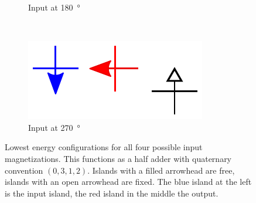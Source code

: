 \documentclass[11pt,a4paper,english]{article}
\newcommand{\rulesep}{\unskip\ \vrule\ }
\begin{document}
\begin{figure}
\begin{subfigure}[t]{0.23\textwidth}
        \caption{Input at \SI{180}{\degree}}
    \end{subfigure}
    \rulesep
    \begin{subfigure}[t]{0.23\textwidth}
        \includegraphics[width=\textwidth]{Figures/half_adder/schematic/000006side_inputs_In1_0312/Input 270 deg.pdf}
        \caption{Input at \SI{270}{\degree}}
    \end{subfigure}
    \caption{Lowest energy configurations for all four possible input magnetizations. This functions as a half adder with quaternary convention $(0,3,1,2)$. Islands with a filled arrowhead are free, islands with an open arrowhead are fixed. The blue island at the left is the input island, the red island in the middle the output.}
\label{fig:HalfAdder_000006side_configurations_In1_0312}
\end{figure}
\end{document}
